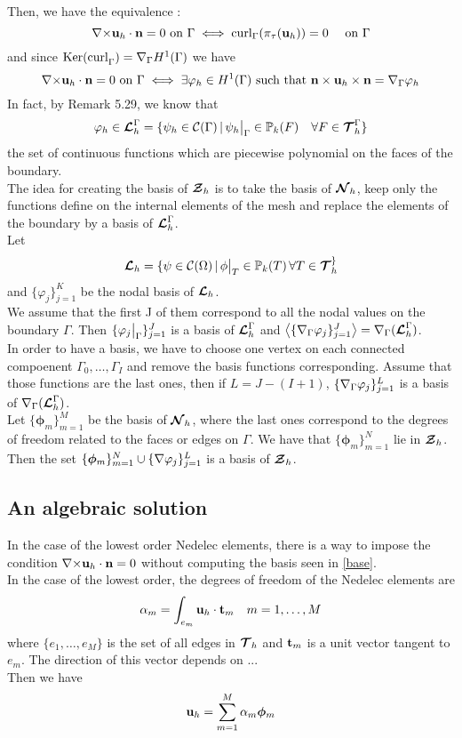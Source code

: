 Then, we have the equivalence :
\[ {\nabla\times}{\mathbf{u}}_h\cdot{\mathbf{n}}=0\mbox{ on }\Gamma \iff
\mathrm{curl}_\Gamma(\pi_\tau({\mathbf{u}}_h))=0\quad \mbox{ on } \Gamma \]
and since $\mathrm{Ker(curl}_\Gamma)={\nabla}_\Gamma H^1(\Gamma)$ we have 
\[ {\nabla\times}{\mathbf{u}}_h\cdot{\mathbf{n}}=0\mbox{ on }\Gamma \iff
\exists\varphi_h\in H^1(\Gamma) \mbox{ such that
}{\mathbf{n}}\times{\mathbf{u}}_h\times{\mathbf{n}} = {\nabla}_\Gamma\varphi_h \]
In fact, by \cite{Monk2003} Remark 5.29, we know that 
\[\varphi_h\in{\bm{\mathcal{L}}}_h^\Gamma = \{\psi_h\in\mathcal{C}(\Gamma) \,|\,
\psi_h{\big\rvert_{\Gamma}}\in{\mathbb{P}}_k(F) \quad \forall F\in{\bm{\mathcal{T}}}_h^\Gamma \}\]
the set of continuous functions which are piecewise polynomial on the faces of
the boundary.\\

The idea for creating the basis of ${\bm{\mathcal{Z}}}_h$ is to take the basis of ${\bm{\mathcal{N}}}_h$, keep
only the functions define on the internal elements of the mesh and replace the
elements of the boundary by a basis of ${\bm{\mathcal{L}}}_h^\Gamma$.\\

Let \[ {\bm{\mathcal{L}}}_h=\{\psi\in\mathcal{C}(\Omega) \,|\,
\phi{\big\rvert_{T}}\in{\mathbb{P}}_k(T)\,\forall T\in{\bm{\mathcal{T}}}_h^\} \]
and $\{\varphi_j\}_{j=1}^K$ be the nodal basis of ${\bm{\mathcal{L}}}_h$.\\
We assume that the first J of them correspond to all the nodal values on the
boundary $\Gamma$. Then $\{\varphi_j{\big\rvert_{\Gamma}}\}_{j=1}^J$ is a
basis of ${\bm{\mathcal{L}}}_h^\Gamma$ and
$\left\langle\{{\nabla}_\Gamma\varphi_j\}_{j=1}^J\right\rangle={\nabla}_\Gamma({\bm{\mathcal{L}}}_h^\Gamma)$.\\
In order to have a basis, we have to choose one vertex on each connected
compoenent $\Gamma_0,\dots,\Gamma_I$ and remove the basis functions
corresponding. Assume that those functions are the last ones, then if
$L=J-(I+1)$, $\{{\nabla}_\Gamma\varphi_j\}_{j=1}^L$ is a basis of
${\nabla}_\Gamma({\bm{\mathcal{L}}}_h^\Gamma)$.\\
Let $\{\bm{\phi}_m\}_{m=1}^M$ be the basis of ${\bm{\mathcal{N}}}_h$, where the last ones
correspond to the degrees of freedom related to the faces or edges on
$\Gamma$. We have that $\{\bm{\phi}_m\}_{m=1}^N$ lie in ${\bm{\mathcal{Z}}}_h$.\\

Then the set $\{\bm{\phi}_m\}_{m=1}^N\cup  \{{\nabla}\varphi_j\}_{j=1}^L$
is a basis of ${\bm{\mathcal{Z}}}_h$.

\subsection{An algebraic solution}
In the case of the lowest order Nedelec elements, there is a way to impose the
condition ${\nabla\times}{\mathbf{u}}_h\cdot{\mathbf{n}}=0$ without computing the basis seen in
  \ref{base}.\\
In the case of the lowest order, the degrees of freedom of the Nedelec elements
are \[\alpha_m=\int_{e_m} {\mathbf{u}}_h\cdot{\mathbf{t}}_m \quad m=1,\dots,M\] where $\{e_1,\dots,e_M\}$ is the set
of all edges in ${\bm{\mathcal{T}}}_h$ and ${\mathbf{t}}_m$ is a unit vector tangent to $e_m$. The
direction of this vector depends on ...\\
Then we have \[{\mathbf{u}}_h = \sum_{m=1}^M \alpha_m\bm{\phi}_m\]

